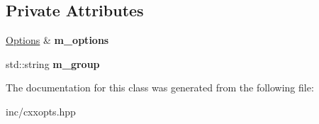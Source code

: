 \subsection*{Private Attributes}
\begin{DoxyCompactItemize}
\item 
\hyperlink{classcxxopts_1_1Options}{Options} \& {\bfseries m\+\_\+options}\hypertarget{classcxxopts_1_1OptionAdder_a84a1bb47fc5417299ceefbbdaf84c6cb}{}\label{classcxxopts_1_1OptionAdder_a84a1bb47fc5417299ceefbbdaf84c6cb}

\item 
std\+::string {\bfseries m\+\_\+group}\hypertarget{classcxxopts_1_1OptionAdder_ab159178d063eaa4836fe828036dc25a8}{}\label{classcxxopts_1_1OptionAdder_ab159178d063eaa4836fe828036dc25a8}

\end{DoxyCompactItemize}


The documentation for this class was generated from the following file\+:\begin{DoxyCompactItemize}
\item 
inc/cxxopts.\+hpp\end{DoxyCompactItemize}
